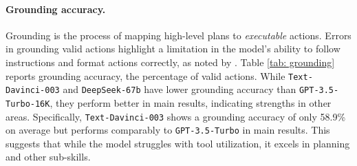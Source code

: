 




\paragraph{Grounding accuracy.} 
Grounding is the process of mapping high-level plans to \textit{executable} actions.
Errors in grounding valid actions highlight a limitation in the model's ability to follow instructions and format actions correctly, as noted by \citet{Zheng2024GPT4VisionIA}. Table \ref{tab: grounding} reports grounding accuracy, the percentage of valid actions. While \texttt{Text-Davinci-003} and \texttt{DeepSeek-67b} have lower grounding accuracy than \texttt{GPT-3.5-Turbo-16K}, they perform better in main results, indicating strengths in other areas. Specifically, \texttt{Text-Davinci-003} shows a grounding accuracy of only 58.9\% on average but performs comparably to \texttt{GPT-3.5-Turbo} in main results. This suggests that while the model struggles with tool utilization, it excels in planning and other sub-skills.
